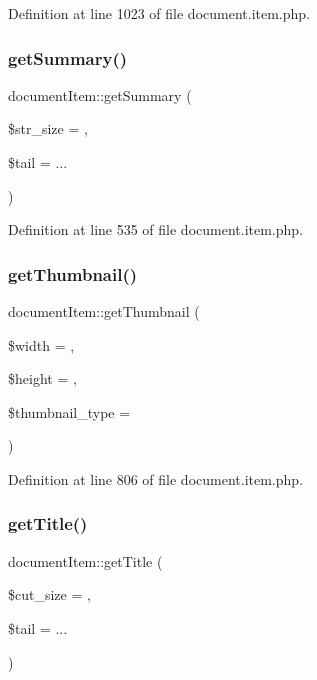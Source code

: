 Definition at line 1023 of file document.\+item.\+php.

\mbox{\label{classdocumentItem_a3c14c5f51f4784b92b78d58f8240f75f}} 
\subsubsection{\texorpdfstring{get\+Summary()}{getSummary()}}
{\footnotesize\ttfamily document\+Item\+::get\+Summary (\begin{DoxyParamCaption}\item[{}]{\$str\+\_\+size = {},  }\item[{}]{\$tail = {\ttfamily \textquotesingle{}...\textquotesingle{}} }\end{DoxyParamCaption})}



Definition at line 535 of file document.\+item.\+php.

\mbox{\label{classdocumentItem_ac45108459a38d6780d8575e892e0b85b}} 
\subsubsection{\texorpdfstring{get\+Thumbnail()}{getThumbnail()}}
{\footnotesize\ttfamily document\+Item\+::get\+Thumbnail (\begin{DoxyParamCaption}\item[{}]{\$width = {},  }\item[{}]{\$height = {},  }\item[{}]{\$thumbnail\+\_\+type = {\ttfamily \textquotesingle{}\textquotesingle{}} }\end{DoxyParamCaption})}



Definition at line 806 of file document.\+item.\+php.

\mbox{\label{classdocumentItem_a365509266cc36e56b66df824bc2fcbfc}} 
\subsubsection{\texorpdfstring{get\+Title()}{getTitle()}}
{\footnotesize\ttfamily document\+Item\+::get\+Title (\begin{DoxyParamCaption}\item[{}]{\$cut\+\_\+size = {},  }\item[{}]{\$tail = {\ttfamily \textquotesingle{}...\textquotesingle{}} }\end{DoxyParamCaption})}



